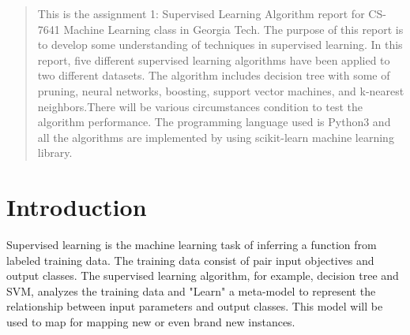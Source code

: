 \documentclass[10pt, conference, compsocconf]{IEEEtran}
\begin{document}
\begin{abstract}
This is the assignment 1: Supervised Learning Algorithm report for CS-7641 Machine Learning class in Georgia Tech. The purpose of this report is to develop some understanding of techniques in supervised learning. In this report, five different supervised learning algorithms have been applied to two different datasets. The algorithm includes decision tree with some of pruning, neural networks, boosting, support vector machines, and k-nearest neighbors.There will be various circumstances condition to test the algorithm performance. The programming language used is Python3 and all the algorithms are implemented by using scikit-learn machine learning library. 
\end{abstract}


%




%
\IEEEpeerreviewmaketitle

\section{Introduction}
Supervised learning is the machine learning task of inferring a function from labeled training data\cite{mohri2012foundations}. The training data consist of pair input objectives and output classes. The supervised learning algorithm, for example, decision tree and SVM, analyzes the training data and "Learn" a meta-model to represent the relationship between input parameters and output classes. This model will be used to map for mapping new or even brand new instances.  
\end{document}
